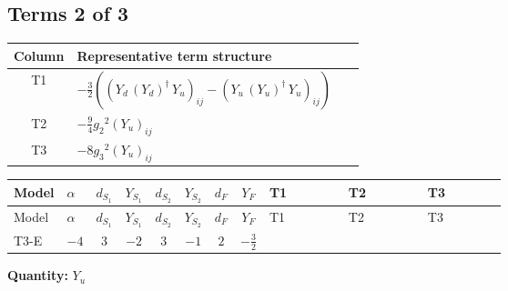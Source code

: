 \documentclass[8pt]{article}
\begin{document}
\begin{landscape}
\subsection*{Terms 2 of 3}
\begin{center}
\begin{tabular}{@{}c >{\raggedright\arraybackslash}p{0.82\linewidth}@{}}
\toprule
Column & Representative term structure \\
\midrule
T1 & \(\displaystyle -\frac{3}{2} (\left({Y_d}\,\left({Y_d}\right)^{\dagger}\,{Y_u}\right)_{ij}-\left({Y_u}\,\left({Y_u}\right)^{\dagger}\,{Y_u}\right)_{ij})\) \\
\midrule
T2 & \(\displaystyle -\frac{9}{4} {g_2}^2 \left({Y_u}\right)_{ij}\) \\
\midrule
T3 & \(\displaystyle -8 {g_3}^2 \left({Y_u}\right)_{ij}\) \\
\midrule
\bottomrule
\end{tabular}
\end{center}
\smallskip
\tiny
\begin{longtable}{@{}llcccccc >{\raggedright\arraybackslash}p{0.21\linewidth} >{\raggedright\arraybackslash}p{0.21\linewidth} >{\raggedright\arraybackslash}p{0.21\linewidth}@{}}
\toprule
Model & $\alpha$ & $d_{S_1}$ & $Y_{S_1}$ & $d_{S_2}$ & $Y_{S_2}$ & $d_F$ & $Y_F$ & T1 & T2 & T3 \\
\midrule
\endfirsthead
\toprule
Model & $\alpha$ & $d_{S_1}$ & $Y_{S_1}$ & $d_{S_2}$ & $Y_{S_2}$ & $d_F$ & $Y_F$ & T1 & T2 & T3 \\
\midrule
\endhead
T3-E & $-4$ & $3$ & $-2$ & $3$ & $-1$ & $2$ & $-\frac{3}{2}$ & \scriptsize\adjustbox{max width=\linewidth}{$\begin{gathered} -\frac{3}{2} (\left({Y_d}\,\left({Y_d}\right)^{\dagger}\,{Y_u}\right)_{ij}-\left({Y_u}\,\left({Y_u}\right)^{\dagger}\,{Y_u}\right)_{ij})\end{gathered}$} & \scriptsize\adjustbox{max width=\linewidth}{$\begin{gathered} -\frac{9}{4} {g_2}^2 \left({Y_u}\right)_{ij}\end{gathered}$} & \scriptsize\adjustbox{max width=\linewidth}{$\begin{gathered} -8 {g_3}^2 \left({Y_u}\right)_{ij}\end{gathered}$} \\
\midrule
\bottomrule
\end{longtable}
\clearpage
\noindent\textbf{Quantity: }$Y_u$\par\smallskip

\end{landscape}
\end{document}
